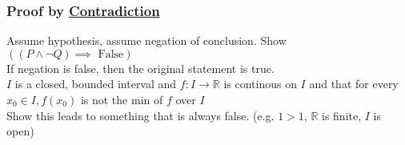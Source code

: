 \documentclass{article}
\begin{document}
\subsubsection{Proof by \underline{Contradiction}}
Assume hypothesis, assume negation of conclusion. Show $((P \wedge \neg Q) \implies \text{ False})$\\
If negation is false, then the original statement is true.\\
$I$ is a closed, bounded interval and $f: I \rightarrow \mathbb{R}$ is continous on $I$ and that for every $x_0 \in I, f(x_0)$ is not the min of $f$ over $I$\\
Show this leads to something that is always false. (e.g. $1>1$, $\mathbb{R}$ is finite, $I$ is open)
\end{document}
